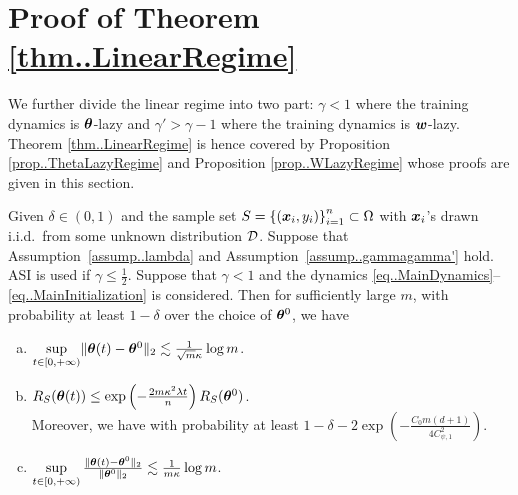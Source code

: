 \documentclass[twoside,11pt]{article}
\begin{document}
\section{Proof of Theorem \ref{thm..LinearRegime}}
We further divide the linear regime into two part: $\gamma<1$ where the training dynamics is $\bm{\theta}$-lazy and $\gamma'>\gamma-1$ where the training dynamics is $\bm{w}$-lazy. Theorem \ref{thm..LinearRegime} is hence covered by Proposition \ref{prop..ThetaLazyRegime} and Proposition \ref{prop..WLazyRegime} whose proofs are given in this section.
\begin{prop}\label{prop..ThetaLazyRegime}
    Given $\delta\in(0,1)$ and the sample set $S = {\{(\bm{x}_i, y_i)\}}_{i=1}^n\subset\Omega$ with $\bm{x}_i$'s drawn i.i.d.\ from some unknown distribution $\mathcal{D}$. Suppose that Assumption~\ref{assump..lambda} and Assumption~\ref{assump..gammagamma'} hold. ASI is used if $\gamma\leq\frac{1}{2}$. Suppose that $\gamma<1$ and the dynamics \eqref{eq..MainDynamics}--\eqref{eq..MainInitialization} is considered. Then for sufficiently large $m$, with probability at least $1-\delta$ over the choice of $\bm{\theta}^0$, we have
    \begin{enumerate}[(a)]
        \item $\sup\limits_{t\in[0,+\infty)}\lVert\bm{\theta}(t)-\bm{\theta}^0\rVert_2\lesssim\frac{1}{\sqrt{m}\kappa}\log m$.
        \item $R_S(\bm{\theta}(t))\leq \exp\left(-\frac{2m\kappa^2\lambda t}{n}\right)R_S(\bm{\theta}^0)$. \\
              Moreover, we have with probability at least $1-\delta-2\exp\left(-\frac{C_0m(d+1)}{4C^2_{\psi,1}}\right)$.
        \item $\sup\limits_{t\in[0,+\infty)}\frac{\lVert\bm{\theta}(t)-\bm{\theta}^0\rVert_2}{\lVert\bm{\theta}^0\rVert_2}\lesssim\frac{1}{m\kappa}\log m$.
    \end{enumerate}
\end{prop}
\end{document}
